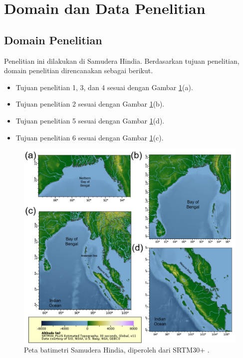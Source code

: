 \vspace{1.5pc}
\section[Domain dan Data Penelitian]{Domain dan Data Penelitian}
\begin{spacing}{1.5}
	\subsection[Domain Penelitian]{Domain Penelitian}
	Penelitian ini dilakukan di Samudera Hindia. Berdasarkan tujuan penelitian, domain penelitian direncanakan sebagai berikut.
	\begin{itemize}
		\item Tujuan penelitian 1, 3, dan 4 sesuai dengan Gambar \ref{fig:domain}(a).
		\item Tujuan penelitian 2 sesuai dengan Gambar \ref{fig:domain}(b).
		\item Tujuan penelitian 5 sesuai dengan Gambar \ref{fig:domain}(d).
		\item Tujuan penelitian 6 sesuai dengan Gambar \ref{fig:domain}(c).
	\end{itemize}
	\begin{figure}[H]
		\centering
		\includegraphics[width=12cm]{contents/Figures/Batimetri_edit_compress}
		\caption{Peta batimetri Samudera Hindia, diperoleh dari SRTM30+ \protect\cite{becker2009global}.}
		\label{fig:domain}
	\end{figure}

\end{spacing}

